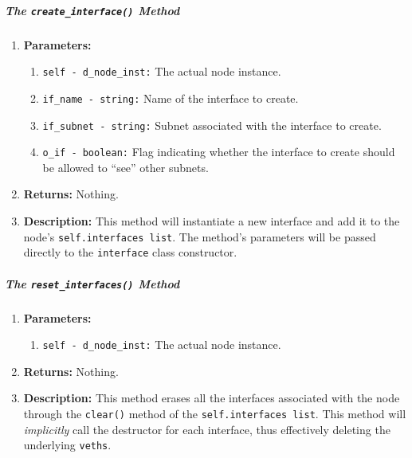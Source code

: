         \subparagraph{The \texttt{create\_interface()} Method}
            \begin{enumerate}
                \item \textbf{Parameters:}
                \begin{enumerate}
                    \item \texttt{self - d\_node\_inst:} The actual node instance.
                    \item \texttt{if\_name - string:} Name of the interface to create.
                    \item \texttt{if\_subnet - string:} Subnet associated with the interface to create.
                    \item \texttt{o\_if - boolean:} Flag indicating whether the interface to create should be allowed to ``see'' other subnets.
                \end{enumerate}
                \item \textbf{Returns:} Nothing.
                \item \textbf{Description:} This method will instantiate a new interface and add it to the node's \texttt{self.interfaces list}. The method's parameters will be passed directly to the \texttt{interface} class constructor.
            \end{enumerate}

        \subparagraph{The \texttt{reset\_interfaces()} Method}
            \begin{enumerate}
                \item \textbf{Parameters:}
                \begin{enumerate}
                    \item \texttt{self - d\_node\_inst:} The actual node instance.
                \end{enumerate}
                \item \textbf{Returns:} Nothing.
                \item \textbf{Description:} This method erases all the interfaces associated with the node through the \texttt{clear()} \cite{bib:python-datastructures} method of the \texttt{self.interfaces list}. This method will \textit{implicitly} call the destructor for each interface, thus effectively deleting the underlying \texttt{veths}.
            \end{enumerate}

